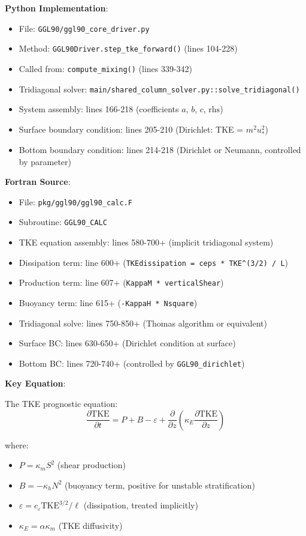 \documentclass[11pt]{article}
\begin{document}
\textbf{Python Implementation}:
\begin{itemize}
    \item File: \verb|GGL90/ggl90_core_driver.py|
    \item Method: \verb|GGL90Driver.step_tke_forward()| (lines 104-228)
    \item Called from: \verb|compute_mixing()| (lines 339-342)
    \item Tridiagonal solver: \verb|main/shared_column_solver.py::solve_tridiagonal()|
    \item System assembly: lines 166-218 (coefficients $a$, $b$, $c$, $\text{rhs}$)
    \item Surface boundary condition: lines 205-210 (Dirichlet: TKE = $m^2 u_*^2$)
    \item Bottom boundary condition: lines 214-218 (Dirichlet or Neumann, controlled by parameter)
\end{itemize}

\textbf{Fortran Source}:
\begin{itemize}
    \item File: \verb|pkg/ggl90/ggl90_calc.F|
    \item Subroutine: \verb|GGL90_CALC|
    \item TKE equation assembly: lines 580-700+ (implicit tridiagonal system)
    \item Dissipation term: line 600+ (\verb|TKEdissipation = ceps * TKE^(3/2) / L|)
    \item Production term: line 607+ (\verb|KappaM * verticalShear|)
    \item Buoyancy term: line 615+ (\verb|-KappaH * Nsquare|)
    \item Tridiagonal solve: lines 750-850+ (Thomas algorithm or equivalent)
    \item Surface BC: lines 630-650+ (Dirichlet condition at surface)
    \item Bottom BC: lines 720-740+ (controlled by \verb|GGL90_dirichlet|)
\end{itemize}

\textbf{Key Equation}:

The TKE prognostic equation:
\begin{equation}
\frac{\partial \text{TKE}}{\partial t} = P + B - \varepsilon + \frac{\partial}{\partial z}\left(\kappa_E \frac{\partial \text{TKE}}{\partial z}\right)
\end{equation}

where:
\begin{itemize}
    \item $P = \kappa_m S^2$ (shear production)
    \item $B = -\kappa_h N^2$ (buoyancy term, positive for unstable stratification)
    \item $\varepsilon = c_\varepsilon \text{TKE}^{3/2} / \ell$ (dissipation, treated implicitly)
    \item $\kappa_E = \alpha \kappa_m$ (TKE diffusivity)
\end{itemize}
\end{document}
